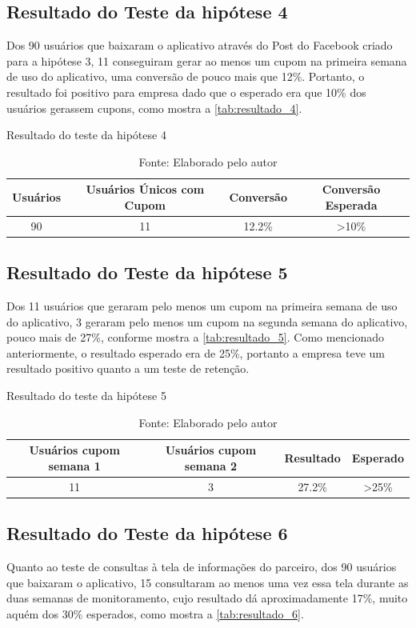 \subsection{Resultado do Teste da hipótese 4}
\label{cha:resultado_4}
Dos 90 usuários que baixaram o aplicativo através do Post do Facebook criado para a hipótese 3, 11 conseguiram gerar ao menos um cupom na primeira semana de uso do aplicativo, uma conversão de pouco mais que 12\%. Portanto, o resultado foi positivo para empresa dado que o esperado era que 10\% dos usuários gerassem cupons, como mostra a \autoref{tab:resultado_4}.
\begin{table}[H]
\centering
\caption{Resultado do teste da hipótese 4}
\label{tab:resultado_4}
\begin{tabular}{|c|c|c|c|}
\hline
Usuários & Usuários Únicos com Cupom & Conversão & Conversão Esperada \\ \hline
90       & 11  & 12.2\%   & \textgreater 10\% \\ \hline
\end{tabular}
\caption* {Fonte: Elaborado pelo autor}    
\end{table}

\subsection{Resultado do Teste da hipótese 5}
\label{cha:resultado_5}
Dos 11 usuários que geraram pelo menos um cupom na primeira semana de uso do aplicativo, 3 geraram pelo menos um cupom na segunda semana do aplicativo, pouco mais de 27\%, conforme mostra a \autoref{tab:resultado_5}. Como mencionado anteriormente, o resultado esperado era de 25\%, portanto a empresa teve um resultado positivo quanto a um teste de retenção.
\begin{table}[H]
\centering
\caption{Resultado do teste da hipótese 5}
\label{tab:resultado_5}
\begin{tabular}{|c|c|c|c|}
\hline
Usuários cupom semana 1 & Usuários cupom semana 2 & Resultado & Esperado \\ \hline
11       & 3  & 27.2\%   & \textgreater 25\% \\ \hline
\end{tabular}
\caption* {Fonte: Elaborado pelo autor}    
\end{table}

\subsection{Resultado do Teste da hipótese 6}
\label{cha:resultado_6}
Quanto ao teste de consultas à tela de informações do parceiro, dos 90 usuários que baixaram o aplicativo, 15 consultaram ao menos uma vez essa tela durante as duas semanas de monitoramento, cujo resultado dá aproximadamente 17\%, muito aquém dos 30\% esperados, como mostra a \autoref{tab:resultado_6}.

